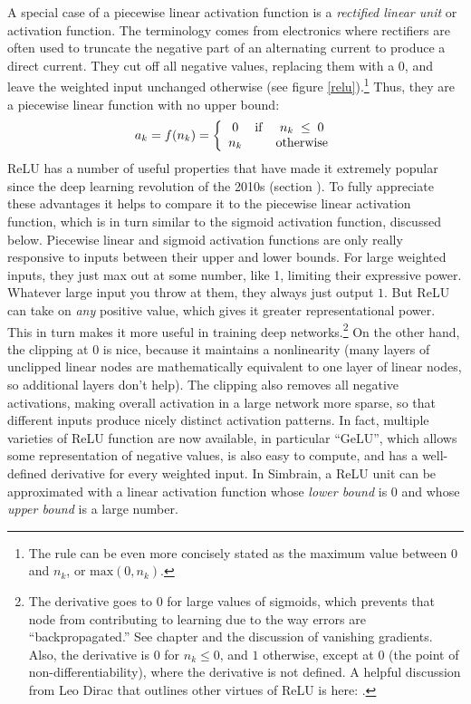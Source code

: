 A special case of a piecewise linear activation function is a \emph{rectified linear unit} or  activation function. The terminology comes from electronics where rectifiers are often used to truncate the negative part of an alternating current to produce a direct current. They cut off all negative values, replacing them with a 0, and leave the weighted input unchanged otherwise (see figure \ref{relu}).\footnote{The rule can be even more concisely stated as the maximum value between 0 and $n_k$, or $\mbox{max}(0,n_k)$.} Thus, they are a piecewise linear function with no upper bound:
\begin{eqnarray*}
a_k = f(n_k) =
\left\{
      \begin{array}{clc}
                  0      & {\rm if} &   n_k\; \leq \; 0          \\
              n_k  &  &  \mbox{otherwise}
      \end{array}
\right.
\end{eqnarray*}
ReLU has a number of useful properties that have made it extremely popular since the deep learning revolution of the 2010s (section ). To fully appreciate these advantages it helps to compare it to the piecewise linear activation function, which is in turn similar to the sigmoid activation function, discussed below. Piecewise linear and sigmoid activation functions are only really responsive to inputs between their upper and lower bounds. For large weighted inputs, they just max out at some number, like 1, limiting their expressive power. Whatever large input you throw at them, they always just output $1$. But ReLU can take on \emph{any} positive value, which gives it greater representational power. This in turn makes it more useful in training deep networks.\footnote{The derivative goes to 0 for large values of sigmoids, which prevents that node from contributing to learning due to the way errors are ``backpropagated.''  See chapter  and the discussion of vanishing gradients. Also, the derivative is $0$ for $n_k \leq 0$, and $1$ otherwise, except at $0$ (the point of non-differentiability), where the derivative is not defined.  A helpful discussion from Leo Dirac that outlines other virtues of ReLU is here: . }  On the other hand, the clipping at $0$ is nice, because it maintains a nonlinearity (many layers of unclipped linear nodes are mathematically equivalent to one layer of linear nodes, so additional layers don't help). The clipping also removes all negative activations, making overall activation in a large network more sparse, so that different inputs produce nicely distinct activation patterns. In fact, multiple varieties of ReLU function are now available, in particular ``GeLU'', which allows some representation of negative values, is also easy to compute, and has a well-defined derivative for every weighted input.  In Simbrain, a ReLU unit can be approximated with a linear activation function whose \emph{lower bound} is 0 and whose \emph{upper bound} is a large number.

